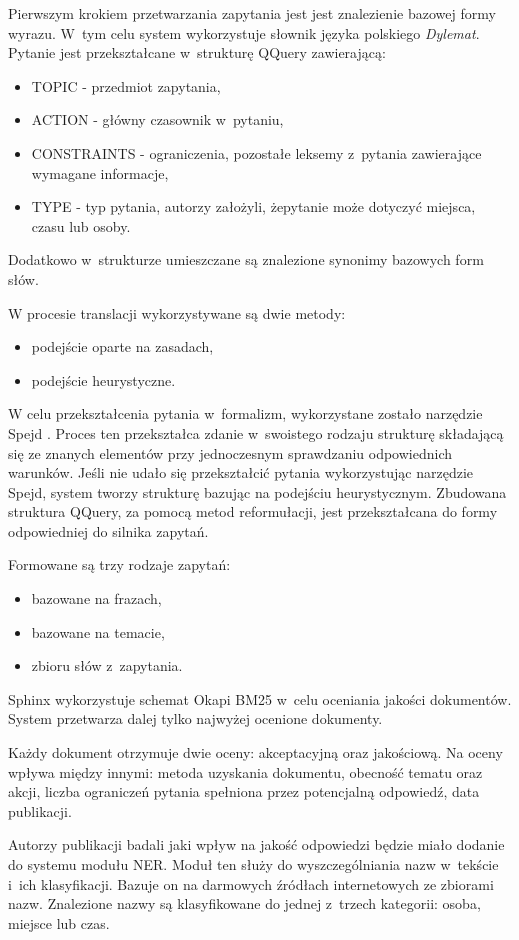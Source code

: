 Pierwszym krokiem przetwarzania zapytania jest jest znalezienie bazowej formy wyrazu. W~tym celu system wykorzystuje słownik języka polskiego \textit{Dylemat}. Pytanie jest przekształcane w~strukturę QQuery zawierającą:
\begin{itemize}
	\item TOPIC - przedmiot zapytania,
	\item ACTION - główny czasownik w~pytaniu,
	\item CONSTRAINTS - ograniczenia, pozostałe leksemy z~pytania zawierające wymagane informacje,
	\item TYPE - typ pytania, autorzy założyli, żepytanie może dotyczyć miejsca, czasu lub osoby.
\end{itemize}
Dodatkowo w~strukturze umieszczane są znalezione synonimy bazowych form słów.

W procesie translacji wykorzystywane są dwie metody: 
\begin{itemize}
	\item podejście oparte na zasadach, 
	\item podejście heurystyczne.
\end{itemize}
W celu przekształcenia pytania w~formalizm, wykorzystane zostało narzędzie Spejd \cite{spejd}. Proces ten przekształca zdanie w~swoistego rodzaju strukturę składającą się ze znanych elementów przy jednoczesnym sprawdzaniu odpowiednich warunków. Jeśli nie udało się przekształcić pytania wykorzystując narzędzie Spejd, system tworzy strukturę bazując na podejściu heurystycznym. Zbudowana struktura QQuery, za pomocą metod reformułacji, jest przekształcana do formy odpowiedniej do silnika zapytań.

Formowane są trzy rodzaje zapytań:
\begin{itemize}
	\item bazowane na frazach,
	\item bazowane na temacie,
	\item zbioru słów z~zapytania.
\end{itemize}

Sphinx wykorzystuje schemat Okapi BM25 w~celu oceniania jakości dokumentów. System przetwarza dalej tylko najwyżej ocenione dokumenty.

Każdy dokument otrzymuje dwie oceny: akceptacyjną oraz jakościową. Na oceny wpływa między innymi: metoda uzyskania dokumentu, obecność tematu oraz akcji, liczba ograniczeń pytania spełniona przez potencjalną odpowiedź, data publikacji.

Autorzy publikacji \cite{polishQAS} badali jaki wpływ na jakość odpowiedzi będzie miało dodanie do systemu modułu NER. Moduł ten służy do wyszczególniania nazw w~tekście i~ich klasyfikacji. Bazuje on na darmowych źródłach internetowych ze zbiorami nazw. Znalezione nazwy są klasyfikowane do jednej z~trzech kategorii: osoba, miejsce lub czas.

